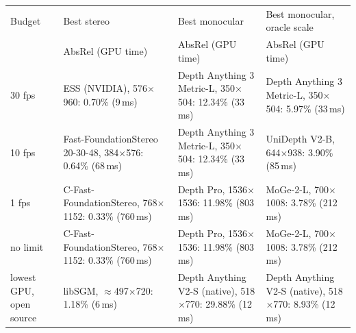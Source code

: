 \begin{tabular}{@{}llll@{}}
\toprule
Budget & Best stereo & Best monocular & Best monocular, oracle scale \\
 & AbsRel (GPU time) & AbsRel (GPU time) & AbsRel (GPU time) \\
\midrule
30 fps & ESS (NVIDIA), 576$\times$960: 0.70\% (9\,ms) & Depth Anything 3 Metric-L, 350$\times$504: 12.34\% (33\,ms) & Depth Anything 3 Metric-L, 350$\times$504: 5.97\% (33\,ms) \\
10 fps & Fast-FoundationStereo 20-30-48, 384$\times$576: 0.64\% (68\,ms) & Depth Anything 3 Metric-L, 350$\times$504: 12.34\% (33\,ms) & UniDepth V2-B, 644$\times$938: 3.90\% (85\,ms) \\
1 fps & C-Fast-FoundationStereo, 768$\times$1152: 0.33\% (760\,ms) & Depth Pro, 1536$\times$1536: 11.98\% (803\,ms) & MoGe-2-L, 700$\times$1008: 3.78\% (212\,ms) \\
no limit & C-Fast-FoundationStereo, 768$\times$1152: 0.33\% (760\,ms) & Depth Pro, 1536$\times$1536: 11.98\% (803\,ms) & MoGe-2-L, 700$\times$1008: 3.78\% (212\,ms) \\
\midrule
lowest GPU, open source & libSGM, $\approx$497$\times$720: 1.18\% (6\,ms) & Depth Anything V2-S (native), 518$\times$770: 29.88\% (12\,ms) & Depth Anything V2-S (native), 518$\times$770: 8.93\% (12\,ms) \\
\bottomrule
\end{tabular}
